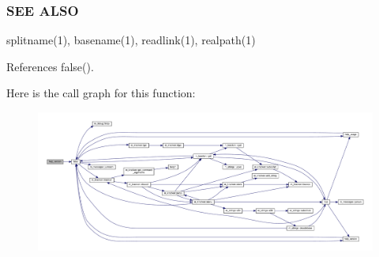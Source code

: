 \subsubsection*{S\+EE A\+L\+SO}

splitname(1), basename(1), readlink(1), realpath(1) 

References false().

Here is the call graph for this function\+:
\nopagebreak
\begin{figure}[H]
\begin{center}
\leavevmode
\includegraphics[width=350pt]{splitname_8f90_a2518cc098132c46ba9d8fd8c74d8fc0d_cgraph}
\end{center}
\end{figure}
